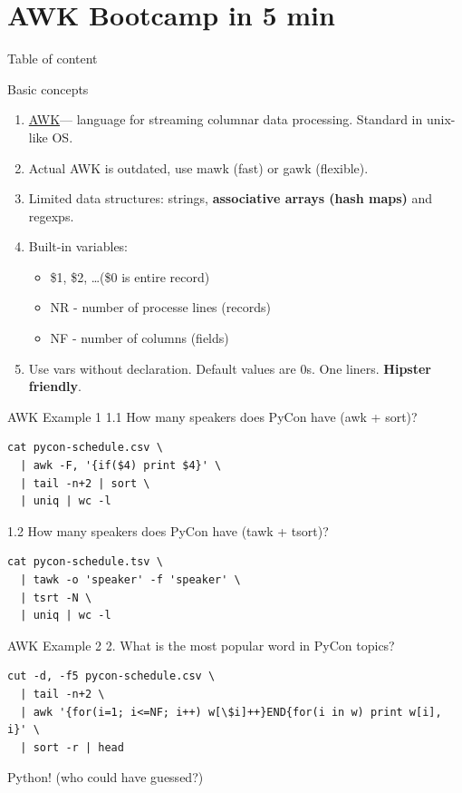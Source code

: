 \documentclass[unicode, notheorems, aspectratio=169]{beamer}
\begin{document}
\section{AWK Bootcamp in 5 min}
\begin{frame}{Table of content}
	\tableofcontents[currentsection]
\end{frame}
\begin{frame}{Basic concepts}
\begin{enumerate}
\item \href{https://en.wikipedia.org/wiki/AWK}{AWK}\footnotemark --- language for streaming columnar data processing. Standard in unix-like OS.
\item Actual AWK is outdated, use mawk (fast) or gawk (flexible).
\item Limited data structures: strings, \textbf{associative arrays (hash maps)} and regexps.
\item Built-in variables:
	\begin{itemize}
	\item \$1, \$2, \dots (\$0 is entire record)
	\item NR - number of processe lines (records)
	\item NF - number of columns (fields)
	\end{itemize}
\item Use vars without declaration. Default values are 0s. One liners. \textbf{Hipster friendly}.
\end{enumerate}
\end{frame}

\begin{frame}[fragile]{AWK Example 1}
1.1 How many speakers does PyCon have (awk + sort)?
\begin{verbatim}
cat pycon-schedule.csv \
  | awk -F, '{if($4) print $4}' \
  | tail -n+2 | sort \
  | uniq | wc -l
\end{verbatim}
\vfill
1.2 How many speakers does PyCon have (tawk + tsort)?
\begin{verbatim}
cat pycon-schedule.tsv \
  | tawk -o 'speaker' -f 'speaker' \
  | tsrt -N \
  | uniq | wc -l
\end{verbatim}
\end{frame}

\begin{frame}[fragile]{AWK Example 2}
2. What is the most popular word in PyCon topics?
\begin{verbatim}
cut -d, -f5 pycon-schedule.csv \
  | tail -n+2 \
  | awk '{for(i=1; i<=NF; i++) w[\$i]++}END{for(i in w) print w[i], i}' \
  | sort -r | head
\end{verbatim}
\pause
\vfill
Python! (who could have guessed?)
\end{frame}
\end{document}
